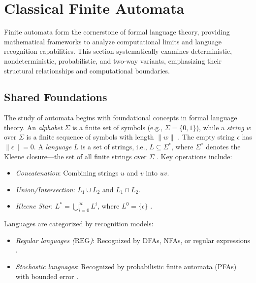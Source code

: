 \section{Classical Finite Automata}
\label{sec:classical-finite-automata} 

Finite automata form the cornerstone of formal language theory, providing mathematical frameworks to analyze computational limits and language recognition capabilities. This section systematically examines deterministic, nondeterministic, probabilistic, and two-way variants, emphasizing their structural relationships and computational boundaries. 

\subsection{Shared Foundations}
\label{subsec:shared-foundations} 

The study of automata begins with foundational concepts in formal language theory. An \textit{alphabet} $\Sigma$ is a finite set of symbols (e.g., $\Sigma = \{0,1\}$), while a \textit{string} $w$ over $\Sigma$ is a finite sequence of symbols with length $\|w\|$ \cite{hopcroft2006introduction}. The empty string $\epsilon$ has $\|\epsilon\| = 0$. A \textit{language} $L$ is a set of strings, i.e., $L \subseteq \Sigma^\ast$, where $\Sigma^\ast$ denotes the Kleene closure—the set of all finite strings over $\Sigma$ \cite{hopcroft2006introduction}. Key operations include:
\begin{itemize}
    \item \textit{Concatenation}: Combining strings $u$ and $v$ into $uv$.
    \item \textit{Union/Intersection}: $L_1 \cup L_2$ and $L_1 \cap L_2$.
    \item \textit{Kleene Star}: $L^\ast = \bigcup_{i=0}^\infty L^i$, where $L^0 = \{\epsilon\}$ \cite{hopcroft2006introduction}.
\end{itemize} 

Languages are categorized by recognition models:
\begin{itemize}
    \item \textit{Regular languages ($\text{REG}$)}: Recognized by DFAs, NFAs, or regular expressions \cite{hopcroft2006introduction}.
    \item \textit{Stochastic languages}: Recognized by probabilistic finite automata (PFAs) with bounded error \cite{rabin1963probabilistic}.
\end{itemize} 

